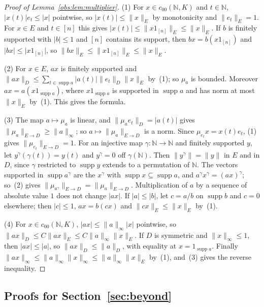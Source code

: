 \documentclass[11pt]{amsart}
\theoremstyle{definition}
\theoremstyle{remark}
\numberwithin{equation}{section}
\newcommand{\N}{\mathbb N}
\newcommand{\abs}[1]{\lvert #1\rvert}
\newcommand{\norm}[1]{\lVert #1\rVert}
\theoremstyle{plain}
\theoremstyle{definition}
\theoremstyle{plain}
\begin{document}
\begin{proof}[Proof of Lemma~\ref{obs:lem:multiplier}]
(1) For $x\in c_{00}(\N,K)$ and $t\in\N$, $\abs{x(t)}e_t\le\abs x$ pointwise, so $\abs{x(t)}\le\norm x_E$ by monotonicity
and $\norm{e_t}_E=1$. For $x\in E$ and $t\in[n]$ this gives $\abs{x(t)}\le\norm{x1_{[n]}}_E\le\norm x_E$. If $b$ is
finitely supported with $\abs b\le1$ and $[n]$ contains its support, then $bx=b(x1_{[n]})$ and $\abs{bx}\le\abs{x1_{[n]}}$,
so $\norm{bx}_E\le\norm{x1_{[n]}}_E\le\norm x_E$.

(2) For $x\in E$, $ax$ is finitely supported and $\norm{ax}_D\le\sum_{t\in\operatorname{supp}a}\abs{a(t)}\norm{e_t}_D
\norm x_E$ by~(1); so $\mu_a$ is bounded. Moreover $ax=a(x1_{\operatorname{supp}a})$, where $x1_{\operatorname{supp}a}$ is
supported in $\operatorname{supp}a$ and has norm at most $\norm x_E$ by~(1). This gives the formula.

(3) The map $a\mapsto\mu_a$ is linear, and $\norm{\mu_ae_t}_D=\abs{a(t)}$ gives $\norm{\mu_a}_{E\to D}\ge\norm a_\infty$;
so $a\mapsto\norm{\mu_a}_{E\to D}$ is a norm. Since $\mu_{e_t}x=x(t)e_t$, (1) gives $\norm{\mu_{e_t}}_{E\to D}=1$. For an
injective map $\gamma\colon\N\to\N$ and finitely supported $y$, let $y^\gamma(\gamma(t))=y(t)$ and $y^\gamma=0$ off
$\gamma(\N)$. Then $\norm{y^\gamma}=\norm y$ in $E$ and in $D$, since $\gamma$ restricted to $\operatorname{supp}y$
extends to a permutation of $\N$. The vectors supported in $\operatorname{supp}a^\gamma$ are the $x^\gamma$ with
$\operatorname{supp}x\subseteq\operatorname{supp}a$, and $a^\gamma x^\gamma=(ax)^\gamma$; so~(2) gives
$\norm{\mu_{a^\gamma}}_{E\to D}=\norm{\mu_a}_{E\to D}$. Multiplication of $a$ by a sequence of absolute value $1$ does not
change $\abs{ax}$. If $\abs a\le\abs b$, let $c=a/b$ on $\operatorname{supp}b$ and $c=0$ elsewhere; then $\abs c\le1$,
$ax=b(cx)$ and $\norm{cx}_E\le\norm x_E$ by~(1).

(4) For $x\in c_{00}(\N,K)$, $\abs{ax}\le\norm a_\infty\abs x$ pointwise, so
$\norm{ax}_D\le C\norm{ax}_E\le C\norm a_\infty\norm x_E$. If $D$ is symmetric and $\norm x_\infty\le1$, then
$\abs{ax}\le\abs a$, so $\norm{ax}_D\le\norm a_D$, with equality at $x=1_{\operatorname{supp}a}$. Finally
$\norm{ax}_\infty\le\norm a_\infty\norm x_\infty\le\norm a_\infty\norm x_E$ by~(1), and~(3) gives the reverse inequality.
\end{proof}
\subsection{Proofs for Section~\ref{sec:beyond}}\label{dfr:ssec:beyond}
\end{document}
